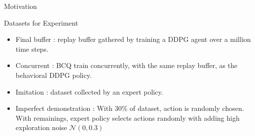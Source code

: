 \documentclass[11pt]{beamer}
\newcommand{\mc}[1]{\mathcal{#1}}
\begin{document}
\begin{frame}{Motivation}
    \begin{block}{Datasets for Experiment}    
        \begin{itemize}
            \item Final buffer : replay buffer gathered by training a DDPG agent over a million time steps.
            \item Concurrent : BCQ train concurrently, with the same replay buffer, as the behavioral DDPG policy.
            \item Imitation : dataset collected by an expert policy.
            \item Imperfect demonstration : With 30\% of dataset, action is randomly chosen. With remainings, expert policy selects actions randomly with adding high exploration noise $\mc{N}(0, 0.3)$
        \end{itemize}
    \end{block}

\end{frame}
\end{document}
